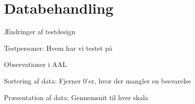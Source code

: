 \chapter{Databehandling}
\label{TestAfSkalaDatabehandling}
%




Ændringer af testdesign

Testpersoner: Hvem har vi testet på 

Observationer i AAL

Sortering af data: Fjerner 0'er, hvor der mangler en besvarelse

Præsentation af data: Gennemsnit til hver skala